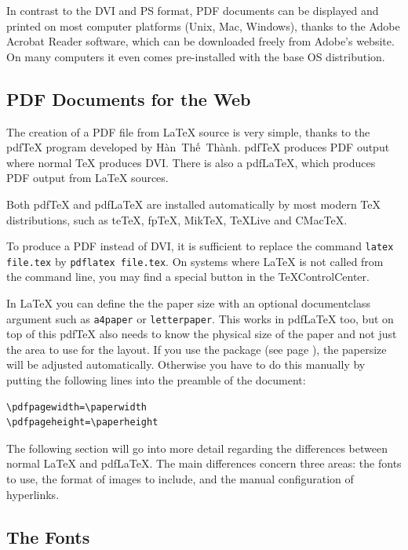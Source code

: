 In contrast to the DVI and PS format, PDF documents can be displayed
and printed on most computer platforms (Unix, Mac, Windows), thanks to
the Adobe Acrobat Reader software, which can be downloaded freely from
Adobe's website. On many computers it even comes pre-installed with the base
OS distribution.

\subsection{PDF Documents for the Web}

The creation of a PDF file from \LaTeX{} source is very simple,
thanks to the pdf\TeX{} program developed by
H\`an~Th\'{\^e}~Th\`anh. pdf\TeX{} produces PDF output where normal
\TeX{} produces DVI. There is also a pdf\LaTeX{}, which produces
  PDF output from \LaTeX{} sources. 

Both pdf\TeX{} and pdf\LaTeX{} are installed automatically by most
modern \TeX{} distributions, such as te\TeX{}, fp\TeX{},
Mik\TeX, \TeX{}Live and CMac\TeX{}.

To produce a PDF instead of DVI, it is sufficient to replace the
command \texttt{latex file.tex} by
\texttt{pdflatex file.tex}. On systems where \LaTeX{} is not called from the
command line, you may find a special button in the \TeX{}ControlCenter.

In \LaTeX{} you can define the the paper size with an 
optional documentclass argument such as \texttt{a4paper} or
\texttt{letterpaper}. This works in pdf\LaTeX{} too, but on top of this
pdf\TeX{} also needs to know the physical size of the paper and not just
the area to use for the layout.
If you use the
 package (see page \pageref{ssec:pdfhyperref}), the
papersize will be adjusted automatically. Otherwise you have to do this
manually by putting the following lines into the preamble of the document:
\begin{code}
\begin{verbatim}
\pdfpagewidth=\paperwidth
\pdfpageheight=\paperheight
\end{verbatim}
\end{code}

The following section will go into more detail regarding the differences
between normal \LaTeX{} and pdf\LaTeX{}. The main differences concern
three areas: the fonts to use, the format of images to include, and the
manual configuration of hyperlinks.

\subsection{The Fonts}

